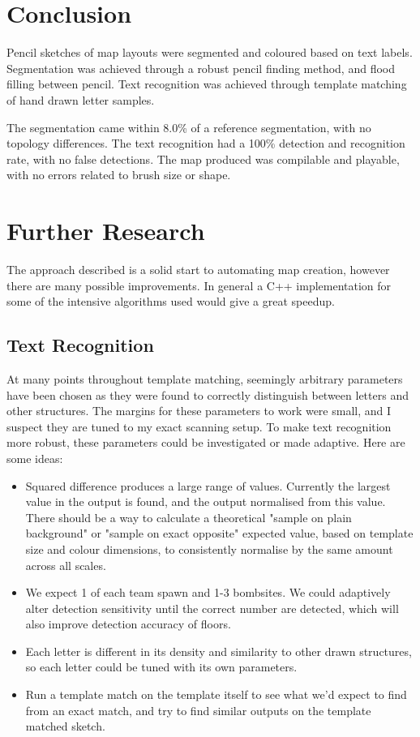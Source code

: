 \documentclass[11pt]{IEEEtran}
\begin{document}
\section{Conclusion}

Pencil sketches of map layouts were segmented and coloured based on text labels. Segmentation was achieved through a robust pencil finding method, and flood filling between pencil. Text recognition was achieved through template matching of hand drawn letter samples. 

The segmentation came within 8.0\% of a reference segmentation, with no topology differences. The text recognition had a 100\% detection and recognition rate, with no false detections. The map produced was compilable and playable, with no errors related to brush size or shape. 

\section{Further Research}

The approach described is a solid start to automating map creation, however there are many possible improvements. In general a C++ implementation for some of the intensive algorithms used would give a great speedup.

\subsection{Text Recognition}

At many points throughout template matching, seemingly arbitrary parameters have been chosen as they were found to correctly distinguish between letters and other structures. The margins for these parameters to work were small, and I suspect they are tuned to my exact scanning setup. To make text recognition more robust, these parameters could be investigated or made adaptive. Here are some ideas:

\begin{itemize}
\item Squared difference produces a large range of values. Currently the largest value in the output is found, and the output normalised from this value. There should be a way to calculate a theoretical "sample on plain background" or "sample on exact opposite" expected value, based on template size and colour dimensions, to consistently normalise by the same amount across all scales. 
\item We expect 1 of each team spawn and 1-3 bombsites. We could adaptively alter detection sensitivity until the correct number are detected, which will also improve detection accuracy of floors. 
\item Each letter is different in its density and similarity to other drawn structures, so each letter could be tuned with its own parameters.
\item Run a template match on the template itself to see what we'd expect to find from an exact match, and try to find similar outputs on the template matched sketch.
\end{itemize}
\end{document}
